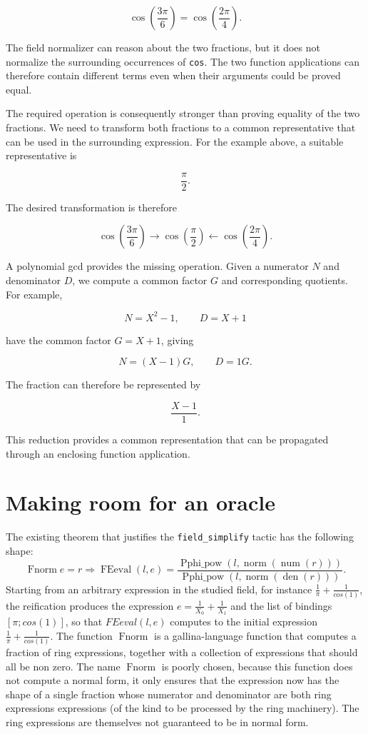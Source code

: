 \documentclass[11pt]{article}
\begin{document}
$$
  \cos\left(\frac{3\pi}{6}\right)
  =
  \cos\left(\frac{2\pi}{4}\right).
$$

The field normalizer can reason about the two fractions, but it does not
normalize the surrounding occurrences of \texttt{cos}. The two function
applications can therefore contain different terms even when their
arguments could be proved equal.

The required operation is consequently stronger than proving equality of
the two fractions. We need to transform both fractions to a common
representative that can be used in the surrounding expression. For the
example above, a suitable representative is

$$
  \frac{\pi}{2}.
$$

The desired transformation is therefore

$$
  \cos\left(\frac{3\pi}{6}\right)
  \longrightarrow
  \cos\left(\frac{\pi}{2}\right)
  \longleftarrow
  \cos\left(\frac{2\pi}{4}\right).
$$

A polynomial gcd provides the missing operation. Given a numerator
$N$ and denominator $D$, we compute a common factor $G$ and corresponding
quotients.  For example,

$$
  N=X^2-1,\qquad D=X+1
$$

have the common factor $G=X+1$, giving

$$
  N=(X-1)G,\qquad D=1G.
$$

The fraction can therefore be represented by

$$
  \frac{X-1}{1}.
$$

This reduction provides a common representation that can be propagated
through an enclosing function application.


\section{Making room for an oracle}
The existing theorem that justifies the {\tt field\_simplify} tactic has the
following shape:
\[
 \operatorname{Fnorm} e = r \Longrightarrow
 \operatorname{FEeval}(l,e)=
 \frac{\operatorname{Pphi\_pow}(l,\operatorname{norm}(\operatorname{num}(r)))}
  {\operatorname{Pphi\_pow}(l,\operatorname{norm}(\operatorname{den}(r)))}.
\]
Starting from an arbitrary expression in the studied field, for instance \(\frac{1}{\pi} + \frac{1}{cos(1)}\), the reification produces the expression
\(e = \frac{1}{X_0} + \frac{1}{X_1}\) and the list of bindings \([\pi;cos(1)]\),
so that \(FEeval(l, e)\) computes to the initial expression 
\(\frac{1}{\pi} + \frac{1}{cos(1)}\).  The function \(\operatorname{Fnorm}\) is a gallina-language function that computes a fraction of ring expressions, together with a collection of expressions that should all be non zero.  The name \(\operatorname{Fnorm}\) is poorly chosen, because this function does not compute a normal form, it only ensures that the expression now has the shape of a single fraction whose numerator and denominator are both ring expressions expressions (of the kind to be processed by the ring machinery).  The ring expressions are themselves not guaranteed to be in normal form.
\end{document}
